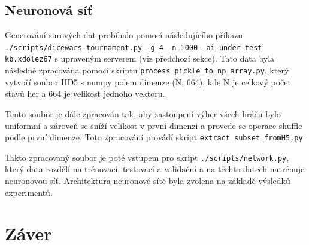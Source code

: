 \documentclass[a4paper, 11pt]{article}
\begin{document}
\subsection{Neuronová síť}


Generování surových dat probíhalo pomocí následujícího příkazu \texttt{./scripts/dicewars-tournament.py -g 4 -n 1000 --ai-under-test kb.xdolez67} s upraveným serverem (viz předchozí sekce). Tato data byla následně zpracována pomocí skriptu \texttt{process\_pickle\_to\_np\_array.py}, který vytvoří soubor HD5 s numpy polem dimenze (N, 664), kde N je celkový počet stavů her a 664 je velikost jednoho vektoru.

Tento soubor je dále zpracován tak, aby zastoupení výher všech hráču bylo uniformní a zároveň se sníží velikost v první dimenzi a provede se operace shuffle podle první dimenze. Toto zpracování provádí skript \texttt{extract\_subset\_fromH5.py}

Takto zpracovaný soubor je poté vstupem pro skript \texttt{./scripts/network.py}, který data rozdělí na trénovací, testovací a validační a na těchto datech natrénuje neuronovou síť. Architektura neuronové sítě byla zvolena na základě výsledků experimentů.



\section{Záver}
\end{document}
